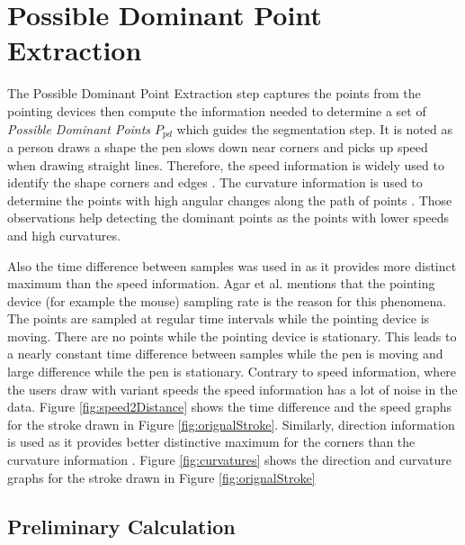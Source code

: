 \section{Possible Dominant Point Extraction}
\label{sec:Preprocessing}
The Possible Dominant Point Extraction step captures the points from the pointing devices then compute the information needed to determine a set of  \textit{Possible Dominant Points $P_{pd}$} which guides the segmentation step. It is noted as a person draws a shape the pen slows down near corners and picks up speed when drawing straight lines. Therefore, the speed information is widely used to identify the shape corners and edges \cite{earlyprocess}. The curvature information is used to determine the points with high angular changes along the path of points \cite{meanshift10}. Those observations help detecting the dominant points as the points with lower speeds and high curvatures. 

Also the time difference between samples was used in \cite{polygonfeedback31} as it provides more distinct maximum than the speed information. Agar et al. \cite{polygonfeedback31} mentions that the pointing device (for example the mouse) sampling rate is the reason for this phenomena. The points are sampled at regular time intervals while the pointing device is moving. There are no points while the pointing device is stationary. This leads to a nearly constant time difference between samples while the pen is moving and large difference while the pen is stationary. Contrary to speed information, where the users draw with variant speeds the speed information has a lot of noise in the data. Figure \ref{fig:speed2Distance} shows the time difference and the speed graphs for the stroke drawn in Figure \ref{fig:orignalStroke}.  Similarly, direction information is used as it provides better distinctive maximum for the corners than the curvature information \cite{meanshift10}. Figure \ref{fig:curvatures} shows the direction and curvature graphs for the stroke drawn in Figure \ref{fig:orignalStroke}

\subsection{Preliminary Calculation}
\label{sec:CurvatureCalculation}
  
